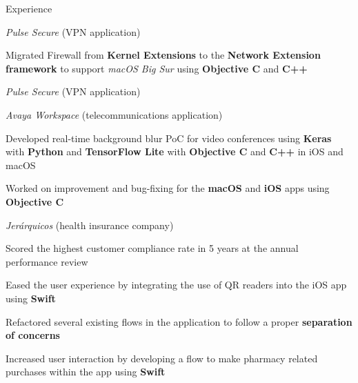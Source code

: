 \documentclass{curriculum}
\begin{document}
\begin{cvsection}{Experience}
        \begin{sectionitemlist}

        \item{\textit{Pulse Secure} (VPN application)}
            \begin{sectionitemlist}
            \item{
                Migrated Firewall from \textbf{Kernel Extensions} to the
                \textbf{Network Extension framework} to support \textit{macOS Big Sur}
                using \textbf{Objective C} and \textbf{C++}
            }
            \end{sectionitemlist}

        \item{\textit{Pulse Secure} (VPN application)}
        \item{\textit{Avaya Workspace} (telecommunications application)}
            \begin{sectionitemlist}
            \item{
                Developed real-time background blur PoC for video conferences using
                \textbf{Keras} with \textbf{Python} and \textbf{TensorFlow Lite}
                with \textbf{Objective C} and \textbf{C++} in iOS and macOS
            }
            \item{
                Worked on improvement and bug-fixing for the \textbf{macOS}
                and \textbf{iOS} apps using \textbf{Objective C}
            }
            \end{sectionitemlist}

        \item{\textit{Jerárquicos} (health insurance company)}
            \begin{sectionitemlist}
            \item{
                Scored the highest customer compliance rate
                in 5 years at the annual performance review
            }
            \item{
                Eased the user experience by integrating the use of
                QR readers into the iOS app using \textbf{Swift}
            }
            \item{
                Refactored several existing flows in the application
                to follow a proper \textbf{separation of concerns}
            }
            \item {
                Increased user interaction by developing a flow to make pharmacy
                related purchases within the app using \textbf{Swift}
            }
            \end{sectionitemlist}


\end{sectionitemlist}
\end{cvsection}
\end{document}
